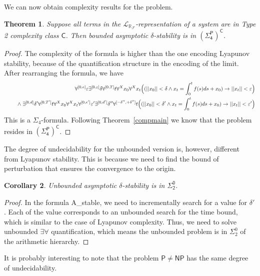 \documentclass[10pt]{article}
\theoremstyle{plain}
\newtheorem{theorem}{Theorem}[section]
\newtheorem{corollary}[theorem]{Corollary}
\theoremstyle{definition}
\newcommand{\p}{\mathsf{P}}
\newcommand{\np}{\mathsf{NP}}
\newcommand{\lrf}{\mathcal{L}_{\mathbb{R}_{\mathcal{F}}}}
\begin{document}
We can now obtain complexity results for the problem. 
\begin{theorem}
Suppose all terms in the $\lrf$-representation of a system are in Type 2 complexity class $\mathsf{C}$. Then bounded asymptotic $\delta$-stability is in $\mathsf{{(\Sigma_4^P)}^C}$.
\end{theorem}
\begin{proof}
The complexity of the formula is higher than the one encoding Lyapunov stability, because of the quantification structure in the encoding of the limit. After rearranging the formula, we have
\begin{eqnarray*}
& &\forall^{[0,e]} \varepsilon\exists^{[0,\varepsilon]} \delta\forall^{[0,T]} t\forall^X x_0\forall^X x_t\Big((||x_0||<\delta \wedge x_t = \int_0^t f(s)ds + x_0 )\rightarrow ||x_t||<\varepsilon\Big)\\
& &\hspace{.5cm}\wedge\; \exists^{[0,d]} \delta'  \forall^{[0,T']} t\forall^X x_0\forall^X x_t\forall^{[0,e']} \varepsilon' \exists^{[0,d']} \delta'' \forall^{[-\delta'',+\delta'']}t \Big( (||x_0||<\delta'\wedge x_t = \int_0^t f(s)ds + x_0 )\rightarrow ||x_t|| < \varepsilon'\Big) 
\end{eqnarray*}
This is a $\Sigma_4$-formula. Following Theorem~\ref{compmain} we know that the problem resides in $\mathsf{{(\Sigma_4^P)}^C}$. 
\end{proof}
The degree of undecidability for the unbounded version is, however, different from Lyapunov stability. This is because we need to find the bound of perturbation that ensures the convergence to the origin. 
\begin{corollary}
Unbounded asymptotic $\delta$-stability is in $\mathsf{\Sigma^0_2}$. 
\end{corollary}
\begin{proof}
In the formula {\sf A\_stable}, we need to incrementally search for a value for $\delta'$. Each of the value corresponds to an unbounded search for the time bound, which is similar to the case of Lyapunov complexity. Thus, we need to solve unbounded $\exists\forall$ quantification, which means the unbounded problem is in $\Sigma^0_2$ of the arithmetic hierarchy. 
\end{proof}
It is probably interesting to note that the problem $\p\neq \np$ has the same degree of undecidability. 
\end{document}
